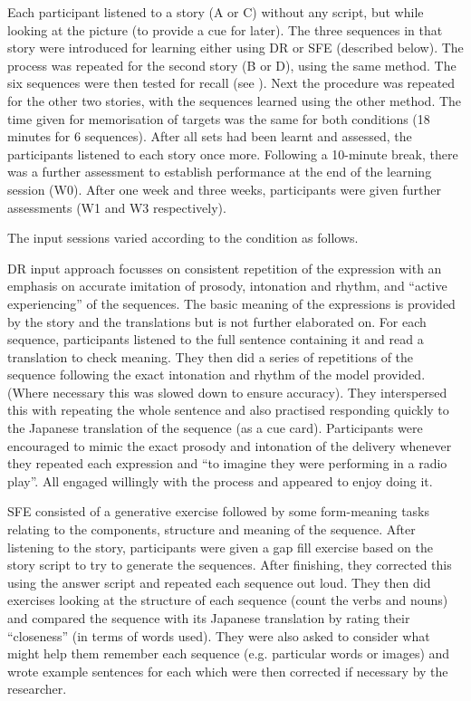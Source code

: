 \documentclass[output=paper]{langscibook}
\begin{document}
Each participant listened to a story (A or C) without any script, but while looking at the picture (to provide a cue for later). The three sequences in that story were introduced for learning either using DR or SFE (described below). The process was repeated for the second story (B or D), using the same method. The six sequences were then tested for recall (see ). Next the procedure was repeated for the other two stories, with the sequences learned using the other method. The time given for memorisation of targets was the same for both conditions (18 minutes for 6 sequences). After all sets had been learnt and assessed, the participants listened to each story once more. Following a 10-minute break, there was a further assessment to establish performance at the end of the learning session (W0). After one week and three weeks, participants were given further assessments (W1 and W3 respectively).

The input sessions varied according to the condition as follows.


DR input approach focusses on consistent repetition of the expression with an emphasis on accurate imitation of prosody, intonation and rhythm, and ``active experiencing'' of the sequences. The basic meaning of the expressions is provided by the story and the translations but is not further elaborated on. For each sequence, participants listened to the full sentence containing it and read a translation to check meaning. They then did a series of repetitions of the sequence following the exact intonation and rhythm of the model provided. (Where necessary this was slowed down to ensure accuracy). They interspersed this with repeating the whole sentence and also practised responding quickly to the Japanese translation of the sequence (as a cue card). Participants were encouraged to mimic the exact prosody and intonation of the delivery whenever they repeated each expression and “to imagine they were performing in a radio play”. All engaged willingly with the process and appeared to enjoy doing it.


SFE consisted of a generative exercise followed by some form-meaning tasks relating to the components, structure and meaning of the sequence. After listening to the story, participants were given a gap fill exercise based on the story script to try to generate the sequences. After finishing, they corrected this using the answer script and repeated each sequence out loud. They then did exercises looking at the structure of each sequence (count the verbs and nouns) and compared the sequence with its Japanese translation by rating their ``closeness'' (in terms of words used). They were also asked to consider what might help them remember each sequence (e.g. particular words or images) and wrote example sentences for each which were then corrected if necessary by the researcher.
\end{document}
